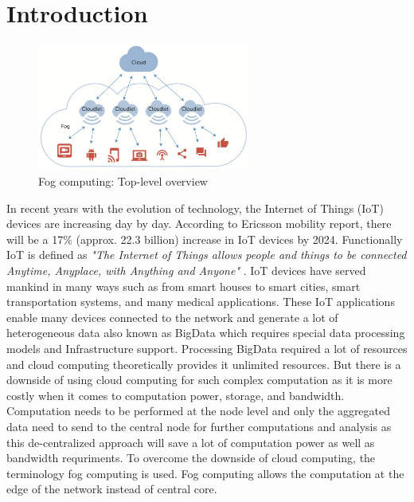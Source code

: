 \section{Introduction}
\label{sec:introduction}
\begin{figure}
  \centering
  \includegraphics[width=70mm]{figures/mlcn-fog-1.pdf}
  \caption{Fog computing: Top-level overview\cite{Bittencourt2017}}
  \label{fig:fog-arch}
\end{figure}
In recent years with the evolution of technology, the Internet of Things (IoT) devices are increasing day by day. According to Ericsson mobility report\cite{erricssonreport}, there will be a 17\% (approx. 22.3 billion) increase in IoT devices by 2024. Functionally IoT is defined as \emph{"The Internet of Things allows people and things to be connected Anytime, Anyplace, with Anything and Anyone"} \cite{euiotdef}. IoT devices have served mankind in many ways such as from smart houses to smart cities, smart transportation systems, and many medical applications. These IoT applications enable many devices connected to the network and generate a lot of heterogeneous data also known as BigData which requires special data processing models and Infrastructure support\cite{Bittencourt2017}. Processing BigData required a lot of resources and cloud computing theoretically provides it unlimited resources\cite{10.1145/3057266}. But there is a downside of using cloud computing for such complex computation as it is more costly when it comes to computation power, storage, and bandwidth\cite{10.1145/3057266}. Computation needs to be performed at the node level and only the aggregated data need to send to the central node for further computations and analysis as this de-centralized approach will save a lot of computation power as well as bandwidth requriments\cite{10.1145/3057266}. To overcome the downside of cloud computing, the terminology fog computing is used. Fog computing allows the computation at the edge of the network instead of central core\cite{10.1145/3057266}. \par
